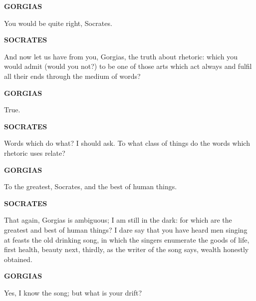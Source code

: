 \documentclass[11pt,letter]{article}
\begin{document}
\par \textbf{GORGIAS}
\par   You would be quite right, Socrates.

\par \textbf{SOCRATES}
\par   And now let us have from you, Gorgias, the truth about rhetoric:  which you would admit (would you not?) to be one of those arts which act always and fulfil all their ends through the medium of words?

\par \textbf{GORGIAS}
\par   True.

\par \textbf{SOCRATES}
\par   Words which do what? I should ask. To what class of things do the words which rhetoric uses relate?

\par \textbf{GORGIAS}
\par   To the greatest, Socrates, and the best of human things.

\par \textbf{SOCRATES}
\par   That again, Gorgias is ambiguous; I am still in the dark:  for which are the greatest and best of human things? I dare say that you have heard men singing at feasts the old drinking song, in which the singers enumerate the goods of life, first health, beauty next, thirdly, as the writer of the song says, wealth honestly obtained.

\par \textbf{GORGIAS}
\par   Yes, I know the song; but what is your drift?
\end{document}
